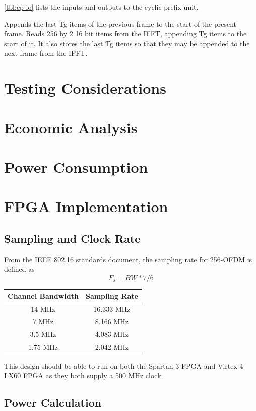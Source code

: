 \documentclass[dvips,10pt,twocolumn]{article}
\begin{document}
	\autoref{tbl:cp-io} lists the inputs and outputs to the cyclic
	prefix unit.

	Appends the last Tg items of the previous frame to the start of the
	present frame.  Reads 256 by 2 16 bit items from the IFFT, appending Tg
	items to the start of it. It also stores the last Tg items so that
	they may be appended to the next frame from the IFFT.


\section{Testing Considerations}
\section{Economic Analysis}
\section{Power Consumption}
\section{FPGA Implementation}
  \subsection{Sampling and Clock Rate}
    From the IEEE 802.16 standards document, the sampling rate for
    256-OFDM is defined as
    \begin{equation}
    F_s = BW * 7/6
    \end{equation}
  
  \begin{center}
  \begin{tabular}{c|c}
  Channel Bandwidth & Sampling Rate \\ \hline
  14 MHz & 16.333 MHz \\
  7 MHz & 8.166 MHz \\
  3.5 MHz & 4.083 MHz \\
  1.75 MHz & 2.042 MHz
  \end{tabular}
  \end{center}
  
  This design should be able to run on both the Spartan-3 FPGA and Virtex 4 LX60
  FPGA as they both supply a 500 MHz clock.
  
  \subsection{Power Calculation}
  
\end{document}
